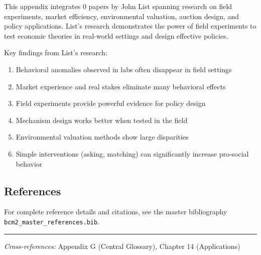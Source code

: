 This appendix integrates 0 papers by John List spanning research on
field experiments, market efficiency, environmental valuation, auction design, and policy applications.
List's research demonstrates the power of field experiments to test economic theories in real-world settings
and design effective policies.

Key findings from List's research:
\begin{enumerate}
  \item Behavioral anomalies observed in labs often disappear in field settings
  \item Market experience and real stakes eliminate many behavioral effects
  \item Field experiments provide powerful evidence for policy design
  \item Mechanism design works better when tested in the field
  \item Environmental valuation methods show large disparities
  \item Simple interventions (asking, matching) can significantly increase pro-social behavior
\end{enumerate}

\subsection{References}

For complete reference details and citations, see the master bibliography
\texttt{bcm2\_master\_references.bib}.

\vspace{1em}
\hrule
\vspace{0.5em}

\noindent\textit{Cross-references:}
Appendix G (Central Glossary), Chapter 14 (Applications)
